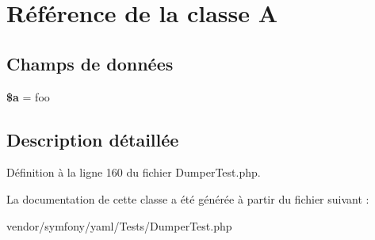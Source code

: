 \hypertarget{class_symfony_1_1_component_1_1_yaml_1_1_tests_1_1_a}{}\section{Référence de la classe A}
\label{class_symfony_1_1_component_1_1_yaml_1_1_tests_1_1_a}
\subsection*{Champs de données}
\begin{DoxyCompactItemize}
\item 
{\bfseries \$a} = \textquotesingle{}foo\textquotesingle{}\hypertarget{class_symfony_1_1_component_1_1_yaml_1_1_tests_1_1_a_acebf83966ef6d7e5645a6b62ba368f9f}{}\label{class_symfony_1_1_component_1_1_yaml_1_1_tests_1_1_a_acebf83966ef6d7e5645a6b62ba368f9f}

\end{DoxyCompactItemize}


\subsection{Description détaillée}


Définition à la ligne 160 du fichier Dumper\+Test.\+php.



La documentation de cette classe a été générée à partir du fichier suivant \+:\begin{DoxyCompactItemize}
\item 
vendor/symfony/yaml/\+Tests/Dumper\+Test.\+php\end{DoxyCompactItemize}
